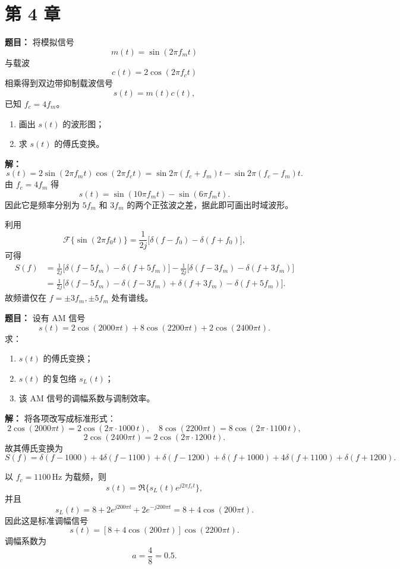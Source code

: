 \section*{第 4 章}

\textbf{题目：}
将模拟信号
\[
m(t)=\sin(2\pi f_m t)
\]
与载波
\[
c(t)=2\cos(2\pi f_c t)
\]
相乘得到双边带抑制载波信号
\[
s(t)=m(t)c(t),
\]
已知 $f_c=4f_m$。

\begin{enumerate}
\item 画出 $s(t)$ 的波形图；
\item 求 $s(t)$ 的傅氏变换。
\end{enumerate}

\par\textbf{解：}
\[
s(t)=2\sin(2\pi f_m t)\cos(2\pi f_c t)
=\sin 2\pi(f_c+f_m)t-\sin 2\pi(f_c-f_m)t.
\]
由 $f_c=4f_m$ 得
\[
s(t)=\sin(10\pi f_m t)-\sin(6\pi f_m t).
\]
因此它是频率分别为 $5f_m$ 和 $3f_m$ 的两个正弦波之差，据此即可画出时域波形。

利用
\[
\mathcal{F}\{\sin(2\pi f_0 t)\}=\frac{1}{2j}\bigl[\delta(f-f_0)-\delta(f+f_0)\bigr],
\]
可得
\begin{align*}
S(f)
&=\frac{1}{2j}\bigl[\delta(f-5f_m)-\delta(f+5f_m)\bigr]
-\frac{1}{2j}\bigl[\delta(f-3f_m)-\delta(f+3f_m)\bigr] \\
&=\frac{1}{2j}\bigl[\delta(f-5f_m)-\delta(f-3f_m)+\delta(f+3f_m)-\delta(f+5f_m)\bigr].
\end{align*}
故频谱仅在 $f=\pm 3f_m,\pm 5f_m$ 处有谱线。

\medskip
{}
\textbf{题目：}
设有 AM 信号
\[
s(t)=2\cos(2000\pi t)+8\cos(2200\pi t)+2\cos(2400\pi t).
\]
求：
\begin{enumerate}
\item $s(t)$ 的傅氏变换；
\item $s(t)$ 的复包络 $s_L(t)$；
\item 该 AM 信号的调幅系数与调制效率。
\end{enumerate}

\par\textbf{解：}
将各项改写成标准形式：
\[
2\cos(2000\pi t)=2\cos(2\pi\cdot 1000\,t),\quad
8\cos(2200\pi t)=8\cos(2\pi\cdot 1100\,t),
\]
\[
2\cos(2400\pi t)=2\cos(2\pi\cdot 1200\,t).
\]
故其傅氏变换为
\[
S(f)=\delta(f-1000)+4\delta(f-1100)+\delta(f-1200)
+\delta(f+1000)+4\delta(f+1100)+\delta(f+1200).
\]

以 $f_c=1100\,\mathrm{Hz}$ 为载频，则
\[
s(t)=\Re\{s_L(t)e^{j2\pi f_ct}\},
\]
并且
\[
s_L(t)=8+2e^{j200\pi t}+2e^{-j200\pi t}=8+4\cos(200\pi t).
\]
因此这是标准调幅信号
\[
s(t)=[8+4\cos(200\pi t)]\cos(2200\pi t).
\]
调幅系数为
\[
a=\frac{4}{8}=0.5.
\]

